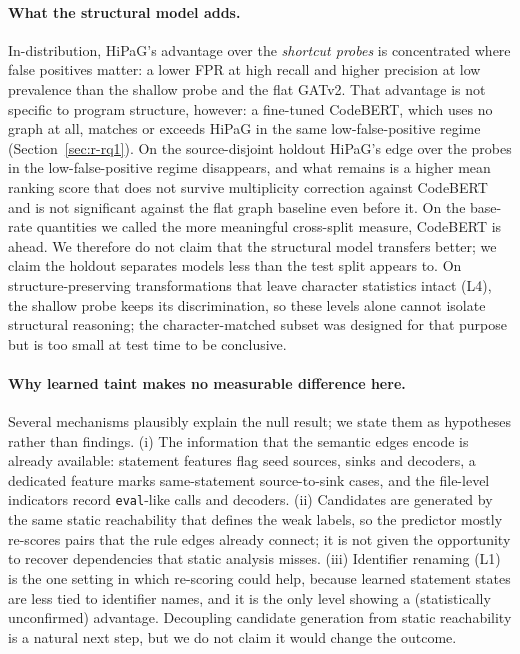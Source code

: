 \documentclass[pdflatex,sn-mathphys-num]{sn-jnl}
\begin{document}
\paragraph{What the structural model adds.} In-distribution, HiPaG's advantage
over the \emph{shortcut probes} is concentrated where false positives matter: a
lower FPR at high recall and higher precision at low prevalence than the
shallow probe and the flat GATv2. That advantage is not specific to program
structure, however: a fine-tuned CodeBERT, which uses no graph at all, matches
or exceeds HiPaG in the same low-false-positive regime
(Section~\ref{sec:r-rq1}). On the source-disjoint holdout HiPaG's edge over the
probes in the low-false-positive regime disappears, and what remains is a
higher mean ranking score that does not survive multiplicity correction
against CodeBERT and is not significant against the flat graph baseline even
before it. On the base-rate quantities we called the more meaningful
cross-split measure, CodeBERT is ahead. We therefore do not claim that the
structural model transfers better; we claim the holdout separates models less
than the test split appears to. On structure-preserving transformations that leave character
statistics intact (L4), the shallow probe keeps its discrimination, so these
levels alone cannot isolate structural reasoning; the character-matched subset
was designed for that purpose but is too small at test time to be conclusive.

\paragraph{Why learned taint makes no measurable difference here.} Several mechanisms plausibly
explain the null result; we state them as hypotheses rather than findings.
(i) The information that the semantic edges encode is already available:
statement features flag seed sources, sinks and decoders, a dedicated feature
marks same-statement source-to-sink cases, and the file-level indicators record
\texttt{eval}-like calls and decoders. (ii) Candidates are generated by the
same static reachability that defines the weak labels, so the predictor mostly
re-scores pairs that the rule edges already connect; it is not given the
opportunity to recover dependencies that static analysis misses.
(iii) Identifier renaming (L1) is the one setting in which re-scoring could
help, because learned statement states are less tied to identifier names, and
it is the only level showing a (statistically unconfirmed) advantage. Decoupling
candidate generation from static reachability is a natural next step, but we do
not claim it would change the outcome.
\end{document}
